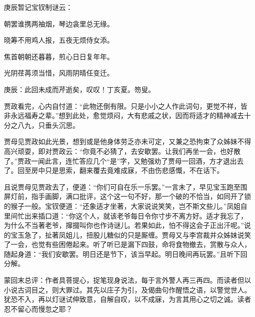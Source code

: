 \begin{poem}
    \begin{note} 庚辰暂记宝钗制谜云：\end{note}

    \begin{pl} 朝罢谁携两袖烟，琴边衾里总无缘。\end{pl}

    \begin{pl} 晓筹不用鸡人报，五夜无烦侍女添。\end{pl}

    \begin{pl} 焦首朝朝还暮暮，煎心日日复年年。\end{pl}

    \begin{pl} 光阴荏苒须当惜，风雨阴晴任变迁。\end{pl}
\end{poem}


\begin{parag}
    \begin{note}庚辰：此回未成而芹逝矣，叹叹！丁亥夏。笏叟。\end{note}
\end{parag}


\begin{parag}
    贾政看完，心内自忖道：“此物还倒有限。只是小小之人作此词句，更觉不祥，皆非永远福寿之辈。”想到此处，愈觉烦闷，大有悲戚之状，因而将适才的精神减去十分之八九，只垂头沉思。
\end{parag}


\begin{parag}
    贾母见贾政如此光景，想到或是他身体劳乏亦未可定，又兼之恐拘束了众姊妹不得高兴顽耍，即对贾政云：“你竟不必猜了，去安歇罢。让我们再坐一会，也好散了。”贾政一闻此言，连忙答应几个“是”字，又勉强劝了贾母一回酒，方才退出去了。回至房中只是思索，翻来覆去竟难成寐，不由伤悲感慨，不在话下。
\end{parag}


\begin{parag}
    且说贾母见贾政去了，便道：“你们可自在乐一乐罢。”一言未了，早见宝玉跑至围屏灯前，指手画脚，满口批评，这个这一句不好，那一个破的不恰当，如同开了锁的猴子一般。宝钗便道：“还象适才坐著，大家说说笑笑，岂不斯文些儿。”凤姐自里间忙出来插口道：“你这个人，就该老爷每日令你寸步不离方好。适才我忘了，为什么不当著老爷，撺掇叫你也作诗谜儿。若果如此，怕不得这会子正出汗呢。”说的宝玉急了，扯著凤姐儿，扭股儿糖似的只是厮缠。贾母又与李宫裁并众姊妹说笑了一会，也觉有些困倦起来。听了听已是漏下四鼓，命将食物撤去，赏散与众人，随起身道：“我们安歇罢。明日还是节下，该当早起。明日晚间再玩罢。”且听下回分解。
\end{parag}


\begin{parag}
    \begin{note}蒙回末总评：作者具菩提心，捉笔现身说法，每于言外警人再三再四。而读者但以小说古词目之，则大罪过。其先以庄子为引，及偈曲句作醒悟之语，以警觉世人。犹恐不入，再以灯谜试伸致意，自解自叹，以不成寐，为言其用心之切之诚。读者忍不留心而慢忽之耶？\end{note}
\end{parag}

